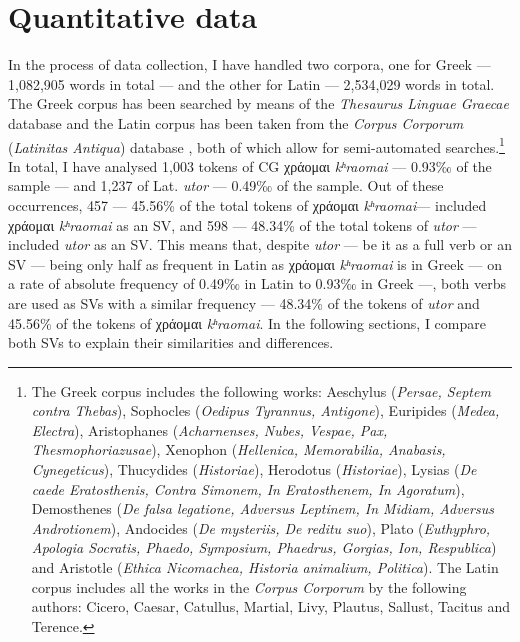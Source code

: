 \documentclass[output=paper,colorlinks,citecolor=brown]{langscibook}
\begin{document}
\section{Quantitative data}\label{sec:ma:3}

In the process of data collection, I have handled two corpora, one for  Greek 
--- 1,082,905 words in total --- and the other for Latin --- 2,534,029 words in total.
The Greek corpus has been searched by means of the \emph{Thesaurus Linguae Graecae} database \parencite{pantelia_thesaurus_nodate} and the Latin corpus
has been taken from the \emph{Corpus Corporum} (\emph{Latinitas Antiqua}) database
\parencite{roelli_corpus_nodate}, both of which allow for semi-automated
searches.\footnote{The Greek corpus includes the following works: Aeschylus (\emph{Persae,
    Septem contra Thebas}), Sophocles (\emph{Oedipus Tyrannus, Antigone}), Euripides
  (\emph{Medea, Electra}), Aristophanes (\emph{Acharnenses, Nubes, Vespae, Pax,
    Thesmophoriazusae}), Xenophon (\emph{Hellenica, Memorabilia, Anabasis, Cynegeticus}),
  Thucydides (\emph{Historiae}), Herodotus (\emph{Historiae}), Lysias (\emph{De caede
    Eratosthenis, Contra Simonem, In Eratosthenem, In Agoratum}), Demosthenes (\emph{De
    falsa legatione, Adversus Leptinem, In Midiam, Adversus Androtionem}), Andocides
  (\emph{De mysteriis, De reditu suo}), Plato (\emph{Euthyphro, Apologia Socratis, Phaedo,
    Symposium, Phaedrus, Gorgias, Ion, Respublica}) and Aristotle (\emph{Ethica
    Nicomachea, Historia animalium, Politica}). The Latin corpus includes all the works in
  the \emph{Corpus Corporum} by the following authors: Cicero, Caesar, Catullus, Martial,
  Livy, Plautus, Sallust, Tacitus and Terence.} In total, I have analysed 1,003 tokens of
CG χράομαι \emph{kʰraomai} --- 0.93‰ of the sample --- and 1,237 of
Lat. \emph{utor} --- 0.49‰ of the sample. Out of these occurrences, 457 --- 45.56\% of the
total tokens of χράομαι \emph{kʰraomai}--- included χράομαι
\emph{kʰraomai} as an SV, and 598 --- 48.34\% of the total tokens of
\emph{utor} --- included \emph{utor} as an SV. This means that, despite \emph{utor} --- be
it as a full verb or an SV --- being only half as frequent in Latin as χράομαι
\emph{kʰraomai} is in Greek --- on a rate of absolute frequency of 0.49‰
in Latin to 0.93‰ in Greek ---, both verbs are used as SVs with a similar frequency ---
48.34\% of the tokens of \emph{utor} and 45.56\% of the tokens of χράομαι
\emph{kʰraomai}. In the following sections, I compare both SVs to
explain their similarities and differences.
\end{document}
